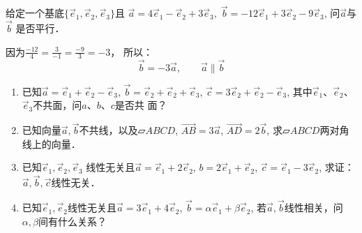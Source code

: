 \begin{example}
    给定一个基底$\{\vec{e}_1,\vec{e}_2,\vec{e}_3\}$且
$\vec{a}=4\vec{e}_1-\vec{e}_2+3\vec{e}_3,\; \vec{b}=-12\vec{e}_1+3\vec{e}_2-9\vec{e}_3$, 问$\vec{a}$与$\vec{b}$
是否平行．
\end{example}

\begin{solution}
因为$\frac{-12}{4}=\frac{3}{-1}=\frac{-9}{3}=-3$，
所以：
\[\vec{b}=-3\vec{a},\qquad \vec{a}\parallel \vec{b}\]    
\end{solution}

\begin{ex}
\begin{enumerate}
    \item 已知$\vec{a}=\vec{e}_1+\vec{e}_2-\vec{e}_3$, $\vec{b}=\vec{e}_2+\vec{e}_2+\vec{e}_3$, $\vec{c} =3\vec{e}_2+\vec{e}_2-\vec{e}_3$, 其中$\vec{e}_1$、$\vec{e}_2$、$\vec{e}_3$不共面，问$a$、$b$、$c$是否共
    面？
    \item     已知向量$\vec{a},\vec{b}$不共线，以及$\parallelogram ABCD$, $\Vec{AB}=3\vec{a}$, $\Vec{AD}=2\vec{b}$, 求$\parallelogram ABCD$两对角线上的向量．
  \item 已知$\vec{e}_1,\vec{e}_2,\vec{e}_3$
    线性无关且$\vec{a}=\vec{e}_1+2\vec{e}_2$, $b=2\vec{e}_1+\vec{e}_2$, 
    $\vec{c}=\vec{e}_1-3\vec{e}_2$, 求证：$\vec{a},\vec{b},\vec{c}$线性无关．
    \item  已知$\vec{e}_1,\vec{e}_2$线性无关且$\vec{a}=3\vec{e}_1+4\vec{e}_2$, $\vec{b}=\alpha\vec{e}_1+\beta \vec{e}_2$, 若$\vec{a}, \vec{b}$线性相关，问$\alpha,\beta$间有什么关系？
    

\end{enumerate}
\end{ex}
